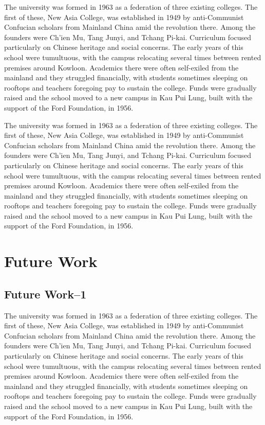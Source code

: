 The university was formed in 1963 as a federation of three existing colleges. The first of these, New Asia College, was established in 1949 by anti-Communist Confucian scholars from Mainland China amid the revolution there. Among the founders were Ch'ien Mu, Tang Junyi, and Tchang Pi-kai. Curriculum focused particularly on Chinese heritage and social concerns. The early years of this school were tumultuous, with the campus relocating several times between rented premises around Kowloon. Academics there were often self-exiled from the mainland and they struggled financially, with students sometimes sleeping on rooftops and teachers foregoing pay to sustain the college. Funds were gradually raised and the school moved to a new campus in Kau Pui Lung, built with the support of the Ford Foundation, in 1956.

The university was formed in 1963 as a federation of three existing colleges. The first of these, New Asia College, was established in 1949 by anti-Communist Confucian scholars from Mainland China amid the revolution there. Among the founders were Ch'ien Mu, Tang Junyi, and Tchang Pi-kai. Curriculum focused particularly on Chinese heritage and social concerns. The early years of this school were tumultuous, with the campus relocating several times between rented premises around Kowloon. Academics there were often self-exiled from the mainland and they struggled financially, with students sometimes sleeping on rooftops and teachers foregoing pay to sustain the college. Funds were gradually raised and the school moved to a new campus in Kau Pui Lung, built with the support of the Ford Foundation, in 1956.


\section{Future Work}
\subsection{Future Work--1}
The university was formed in 1963 as a federation of three existing colleges. The first of these, New Asia College, was established in 1949 by anti-Communist Confucian scholars from Mainland China amid the revolution there. Among the founders were Ch'ien Mu, Tang Junyi, and Tchang Pi-kai. Curriculum focused particularly on Chinese heritage and social concerns. The early years of this school were tumultuous, with the campus relocating several times between rented premises around Kowloon. Academics there were often self-exiled from the mainland and they struggled financially, with students sometimes sleeping on rooftops and teachers foregoing pay to sustain the college. Funds were gradually raised and the school moved to a new campus in Kau Pui Lung, built with the support of the Ford Foundation, in 1956.

